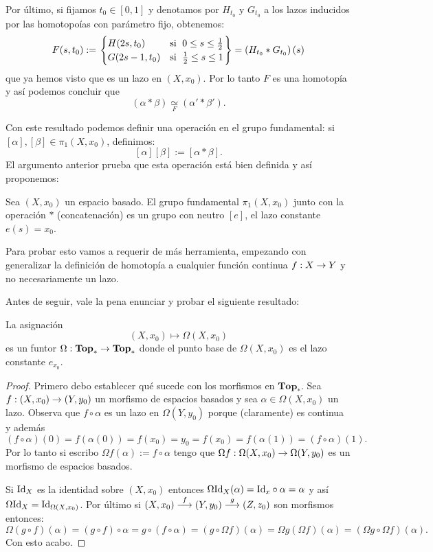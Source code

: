 \documentclass[../../topologia_algebraica]{subfiles}
\begin{document}
Por \'ultimo, si fijamos $t_0\in[0,1]$ y denotamos por $H_{t_0}$ y $G_{t_0}$ a los lazos inducidos por
las homotopo\'ias con par\'ametro fijo, obtenemos:
\[
  F(s,t_0):=\left.
  \begin{cases}
    H(2s,t_0) & \text{si }\; 0\leq s\leq \frac{1}{2}\\
    G(2s-1,t_0) & \text{si }\; \frac{1}{2}\leq s\leq 1
  \end{cases}\right\}=
  \left( H_{t_0}*G_{t_0} \right)(s)
\]
que ya hemos visto que es un lazo en $(X,x_0)$. Por lo tanto $F$ es una homotop\'ia y as\'i podemos
concluir que
\[
  (\alpha*\beta)\underset{F}{\simeq}(\alpha'*\beta').
\]

Con este resultado podemos definir una operaci\'on en el grupo fundamental: si
$[\alpha],[\beta]\in\pi_1(X,x_0)$, definimos:
\[
  [\alpha][\beta]:=[\alpha*\beta].
\]
El argumento anterior prueba que esta operaci\'on est\'a bien definida y as\'i proponemos:
\begin{thm}\label{thm:pi_es_grupo}
  Sea $(X,x_0)$ un espacio basado. El grupo fundamental $\pi_1(X,x_0)$ junto con la operaci\'on
  $*$ (concatenaci\'on) es un grupo con neutro $[e]$, el lazo constante $e(s)=x_0$.
\end{thm}

Para probar esto vamos a requerir de m\'as herramienta, empezando con generalizar la definici\'on
de homotop\'ia a cualquier funci\'on continua $f:X\rightarrow Y$ y no necesariamente un lazo.

Antes de seguir, vale la pena enunciar y probar el siguiente resultado:
\begin{prop}\label{prop:omega_funtor}
  La asignaci\'on
  \[
      (X,x_0) \mapsto \Omega(X,x_0)
  \]
  es un funtor $\Omega:\mathbf{Top}_*\rightarrow\mathbf{Top}_*$ donde el punto base de $\Omega(X,x_0)$
  es el lazo constante $e_{x_0}$.
\end{prop}
\begin{proof}
  Primero debo establecer qu\'e sucede con los morfismos en $\mathbf{Top}_*$. Sea
  $f:(X,x_0)\rightarrow(Y,y_0)$ un morfismo de espacios basados y sea $\alpha\in\Omega(X,x_0)$ un lazo.
  Observa que $f\circ\alpha$ es un lazo en $\Omega(Y,y_0)$ porque (claramente) es continua y
  adem\'as
  \[
    (f\circ\alpha)(0)=f(\alpha(0))=f(x_0)=y_0=f(x_0)=f(\alpha(1))=(f\circ\alpha)(1).
  \]
  Por lo tanto si escribo $\Omega f(\alpha):=f\circ\alpha$ tengo que
  $\Omega f:\Omega(X,x_0)\rightarrow\Omega(Y,y_0)$ es un morfismo de espacios basados.

  Si $\text{Id}_X$ es la identidad sobre $(X,x_0)$ entonces $\Omega\text{Id}_X(\alpha)=\text{Id}_x\circ\alpha=\alpha$
  y as\'i $\Omega\text{Id}_X=\text{Id}_{\Omega(X,x_0)}$. Por \'ultimo si $(X,x_0)\overset{f}{\longrightarrow}(Y,y_0)\overset{g}{\longrightarrow}(Z,z_0)$
  son morfismos entonces:
  \[
    \Omega(g\circ f)(\alpha)=(g\circ f)\circ\alpha=g\circ(f\circ\alpha)=(g\circ\Omega f)(\alpha)=
    \Omega g (\Omega f)(\alpha)=(\Omega g\circ\Omega f)(\alpha).
  \]
  Con esto acabo.
  
\end{proof}
\end{document}
